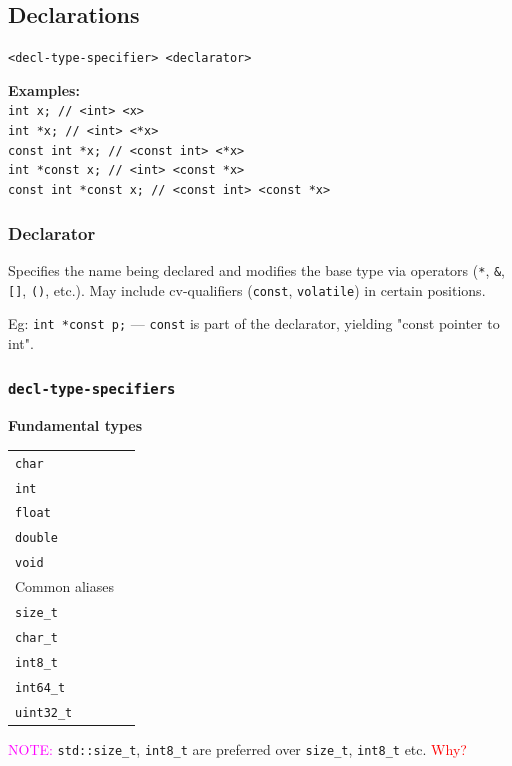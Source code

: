 \subsection{Declarations}

\texttt{<decl-type-specifier> <declarator>}
\begin{mdframed}[nobreak=true,backgroundcolor=gray!10,linecolor=Firebrick4]
\textbf{Examples:}\\
\texttt{int x; // <int> <x>}\\
\texttt{int *x; // <int> <*x>}\\
\texttt{const int *x; // <const int> <*x>}\\
\texttt{int *const x; // <int> <const *x>}\\
\texttt{const int *const x; // <const int> <const *x>}
\end{mdframed}

\subsubsection{Declarator}
Specifies the name being declared and modifies the base type via operators (\texttt{*}, \texttt{\&}, \texttt{[]}, \texttt{()}, etc.). May include cv-qualifiers (\texttt{const}, \texttt{volatile}) in certain positions.

Eg: \texttt{int *const p;} --- \texttt{const} is part of the declarator, yielding "const pointer to int".

\subsubsection{\texttt{decl-type-specifiers}}

\textbf{Fundamental types}\\
\begin{tabularx}{\linewidth}{lX}
    \hline
    \texttt{char}       & \\
    \texttt{int}        & \\
    \texttt{float}      & \\
    \texttt{double}     & \\
    \texttt{void}       & \\
    \hline
Common aliases & \\
    \hline
    \texttt{size\_t}     & \\
    \texttt{char\_t}     & \\
    \texttt{int8\_t}     & \\
    \texttt{int64\_t}    & \\
    \texttt{uint32\_t}   & \\
    \hline
\end{tabularx}
\textcolor{magenta}{NOTE:} \texttt{std::size\_t}, \texttt{int8\_t} are
preferred over \texttt{size\_t}, \texttt{int8\_t} etc. \textcolor{red}{Why?}



